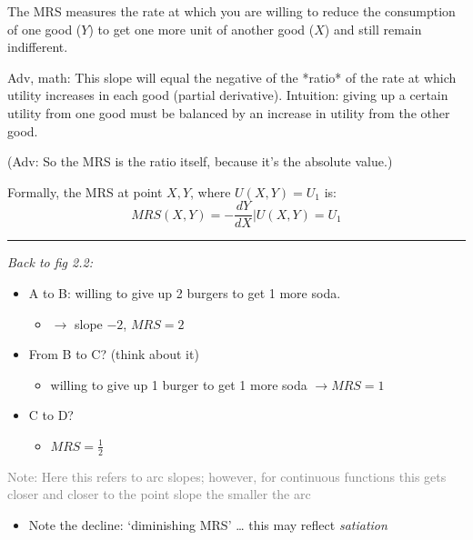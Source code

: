 \documentclass[]{article}
\providecommand{\tightlist}{%
  \setlength{\itemsep}{0pt}\setlength{\parskip}{0pt}}
\begin{document}
The MRS measures the rate at which you are willing to reduce the consumption of one good (\(Y\)) to get one more unit of another good (\(X\)) and still remain indifferent.

\textcolor{RawSienna}{Adv, math: This slope will equal the negative of the *ratio* of the rate at which utility increases in each good (partial derivative).
Intuition: giving up a certain utility from one good must be balanced by an increase in utility from the other good.}

\textcolor{RawSienna}{(Adv: So the MRS is the ratio itself, because it's the absolute value.)}

Formally, the MRS at point \(X,Y\), where \(U(X,Y)=U_1\) is:
\[MRS(X,Y)=-\frac{dY}{dX}|U(X,Y)=U_1\]

\begin{center}\rule{0.5\linewidth}{\linethickness}\end{center}

\emph{Back to fig 2.2:}

\begin{itemize}
\tightlist
\item
  A to B: willing to give up 2 burgers to get 1 more soda.

  \begin{itemize}
  \tightlist
  \item
    \(\rightarrow\) slope \(-2\), \(MRS=2\)
  \end{itemize}
\item
  From B to C? (think about it)

  \begin{itemize}
  \tightlist
  \item
    willing to give up 1 burger to get 1 more soda \(\rightarrow MRS =1\)
  \end{itemize}
\item
  C to D?

  \begin{itemize}
  \tightlist
  \item
    \(MRS = \frac{1}{2}\)
  \end{itemize}
\end{itemize}

\textcolor{gray}{Note: Here this refers to arc slopes; however, for continuous functions this gets closer and closer to the point slope the smaller the arc}

\begin{itemize}
\tightlist
\item
  Note the decline: `diminishing MRS' \ldots{} this may reflect \emph{satiation}
\end{itemize}
\end{document}

